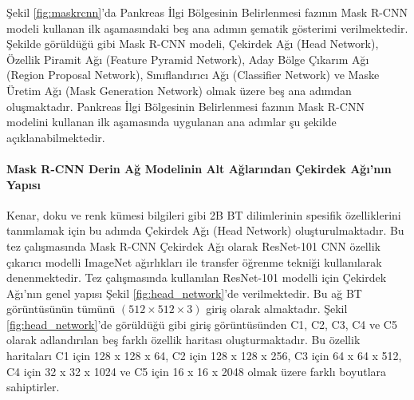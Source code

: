Şekil \ref{fig:maskrcnn}’da Pankreas İlgi Bölgesinin Belirlenmesi fazının Mask R-CNN modeli kullanan ilk aşamasındaki beş ana adımın şematik gösterimi verilmektedir. Şekilde görüldüğü gibi Mask R-CNN modeli, Çekirdek Ağı (Head Network), Özellik Piramit Ağı (Feature Pyramid Network), Aday Bölge Çıkarım Ağı (Region Proposal Network), Sınıflandırıcı Ağı (Classifier Network) ve Maske Üretim Ağı (Mask Generation Network) olmak üzere beş ana adımdan oluşmaktadır. Pankreas İlgi Bölgesinin Belirlenmesi fazının Mask R-CNN modelini kullanan ilk aşamasında uygulanan ana adımlar şu şekilde açıklanabilmektedir.

\paragraph{Mask R-CNN Derin Ağ Modelinin Alt Ağlarından Çekirdek Ağı'nın Yapısı}

Kenar, doku ve renk kümesi bilgileri gibi 2B BT dilimlerinin spesifik özelliklerini tanımlamak için bu adımda Çekirdek Ağı (Head Network) oluşturulmaktadır. Bu tez çalışmasında Mask R-CNN Çekirdek Ağı olarak ResNet-101 CNN özellik çıkarıcı modelli ImageNet ağırlıkları ile transfer öğrenme tekniği kullanılarak denenmektedir. Tez çalışmasında kullanılan ResNet-101 modelli için Çekirdek Ağı'nın genel yapısı Şekil \ref{fig:head_network}’de verilmektedir. Bu ağ BT görüntüsünün tümünü $(512 \times 512 \times 3)$ giriş olarak almaktadır. Şekil \ref{fig:head_network}’de görüldüğü gibi giriş görüntüsünden C1, C2, C3, C4 ve C5 olarak adlandırılan beş farklı özellik haritası oluşturmaktadır. Bu özellik haritaları C1 için 128 x 128 x 64, C2 için 128 x 128 x 256, C3 için 64 x 64 x 512, C4 için 32 x 32 x 1024 ve C5 için 16 x 16 x 2048 olmak üzere farklı boyutlara sahiptirler. 

